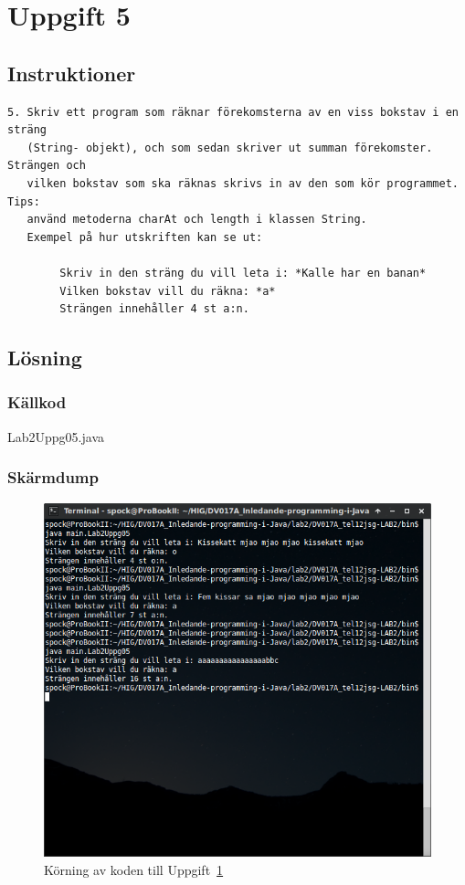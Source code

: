 \section{Uppgift 5}\label{sec:uppg05}

\subsection{Instruktioner}
\begin{verbatim}
5. Skriv ett program som räknar förekomsterna av en viss bokstav i en sträng
   (String- objekt), och som sedan skriver ut summan förekomster. Strängen och
   vilken bokstav som ska räknas skrivs in av den som kör programmet. Tips:
   använd metoderna charAt och length i klassen String.
   Exempel på hur utskriften kan se ut:

        Skriv in den sträng du vill leta i: *Kalle har en banan*
        Vilken bokstav vill du räkna: *a*
        Strängen innehåller 4 st a:n.
\end{verbatim}


\subsection{Lösning}

\subsubsection{Källkod}
\caption{Lab2Uppg05.java}
\label{src:uppg05}


\subsubsection{Skärmdump}
\begin{figure}[htbp]
    \centering
        \includegraphics[width=\linewidth]{img/05.png}
    \caption{Körning av koden till Uppgift~\ref{sec:uppg05}}
    \label{fig:uppg05-screenshot}
\end{figure}

